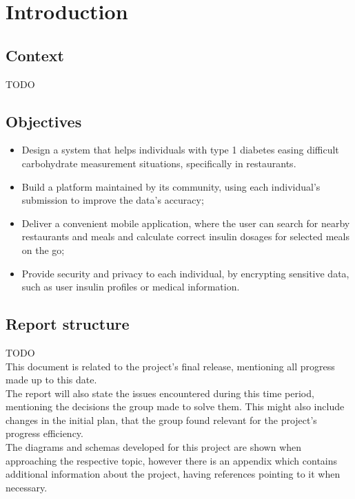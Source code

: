 %
%

\chapter{Introduction}

\section{Context}

TODO\\

\section{Objectives}

\begin{itemize}
    \item Design a system that helps individuals with type 1 diabetes easing difficult carbohydrate measurement situations, specifically in restaurants.
    \item Build a platform maintained by its community, using each individual's submission to improve the data's accuracy;
    \item Deliver a convenient mobile application, where the user can search for nearby restaurants and meals and calculate correct insulin dosages
    for selected meals on the go;
    \item Provide security and privacy to each individual, by encrypting sensitive data, such as user insulin profiles or medical information.
\end{itemize}

\section{Report structure}

TODO\\

This document is related to the project's final release, mentioning all progress made up to this date.\\

The report will also state the issues encountered during this time period, mentioning the 
decisions the group made to solve them. This might also include changes in the
initial plan, that the group found relevant for the project's progress efficiency.\\

The diagrams and schemas developed for this project are shown when approaching the respective topic,
however there is an appendix which contains additional information about the project, having 
references pointing to it when necessary.
